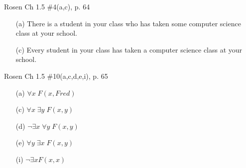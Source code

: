 \begin{questions}
 Rosen Ch 1.5 \#4(a,c), p. 64
    \ifprintanswers
        \vspace{-12pt}
    \fi
  \begin{solution}
      \begin{itemize}[itemsep=0pt,parsep=0pt,topsep=0pt,partopsep=0pt]
         \item[(a)] There is a student in your class who has taken some computer science class at your school.
         \item[(c)] Every student in your class has taken a computer science class at your school.
      \end{itemize}
  \end{solution}




 Rosen Ch 1.5 \#10(a,c,d,e,i), p. 65
    \ifprintanswers
        \vspace{-12pt}
    \fi
  \begin{solution}
      \begin{itemize}[itemsep=0pt,parsep=0pt,topsep=0pt,partopsep=0pt]
         \item[(a)] $\forall x\; F(x,Fred)$
          \item[(c)] $\forall x\; \exists y\; F(x,y)$
         \item[(d)] $\neg \exists x\; \forall y\; F(x,y)$
         \item[(e)] $ \forall y\; \exists x\; F(x,y)$
         \item[(i)] $\neg \exists x F(x,x)$
      \end{itemize}
  \end{solution}




\end{questions}

